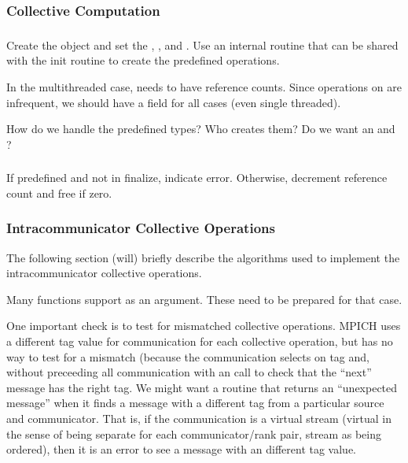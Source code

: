 \documentclass{article}
\begin{document}


\subsubsection{Collective Computation}

\subsubsection{}
Create the object and set the ,
, and .  Use an 
internal routine that can be shared with the init routine to create
the predefined operations.

In the multithreaded case,  needs to have reference counts.
Since operations on  are infrequent, we should have a
 field for all cases (even single threaded).

How do we handle the predefined types?  Who creates them?  Do we want an 
 and ?

\subsubsection{}
If predefined and not in finalize, indicate error.
Otherwise, decrement reference count and free if zero.


\subsubsection{Intracommunicator Collective Operations}
The following section (will) briefly describe the algorithms used to implement
the intracommunicator collective operations.

Many functions support  as an argument.  These need to
be prepared for that case.

One important check is to test for mismatched collective operations.
MPICH uses a different tag value for communication for each collective
operation, but has no way to test for a mismatch (because the
communication selects on tag and, without preceeding all communication
with an  call to check that the ``next'' message
has the right tag.  We might want a routine that returns an
``unexpected message'' when it finds a message with a different tag
from a particular source and communicator.
That is, if the communication is a virtual stream (virtual in the
sense of being separate for each communicator/rank pair, stream as
being ordered), then it is
an error to see a message with an different tag value.  
\end{document}
